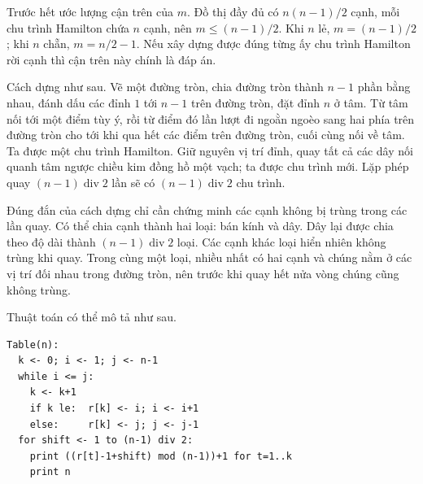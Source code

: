 \documentclass[11pt]{article}
\begin{document}
Trước hết ước lượng cận trên của $m$. Đồ thị đầy đủ có $n(n-1)/2$ cạnh, mỗi
chu trình Hamilton chứa $n$ cạnh, nên $m\le (n-1)/2$. Khi $n$ lẻ,
$m=(n-1)/2$; khi $n$ chẵn, $m=n/2-1$. Nếu xây dựng được đúng từng ấy chu
trình Hamilton rời cạnh thì cận trên này chính là đáp án.

Cách dựng như sau. Vẽ một đường tròn, chia đường tròn thành $n-1$ phần bằng
nhau, đánh dấu các đỉnh $1$ tới $n-1$ trên đường tròn, đặt đỉnh $n$ ở tâm.
Từ tâm nối tới một điểm tùy ý, rồi từ điểm đó lần lượt đi ngoằn ngoèo sang
hai phía trên đường tròn cho tới khi qua hết các điểm trên đường tròn, cuối
cùng nối về tâm. Ta được một chu trình Hamilton. Giữ nguyên vị trí đỉnh, quay
tất cả các dây nối quanh tâm ngược chiều kim đồng hồ một vạch; ta được chu
trình mới. Lặp phép quay $(n-1)\operatorname{div}2$ lần sẽ có
$(n-1)\operatorname{div}2$ chu trình.

\begin{center}
\end{center}

Đúng đắn của cách dựng chỉ cần chứng minh các cạnh không bị trùng trong các
lần quay. Có thể chia cạnh thành hai loại: bán kính và dây. Dây lại được chia
theo độ dài thành $(n-1)\operatorname{div}2$ loại. Các cạnh khác loại hiển
nhiên không trùng khi quay. Trong cùng một loại, nhiều nhất có hai cạnh và
chúng nằm ở các vị trí đối nhau trong đường tròn, nên trước khi quay hết nửa
vòng chúng cũng không trùng.

Thuật toán có thể mô tả như sau.

\begin{verbatim}
Table(n):
  k <- 0; i <- 1; j <- n-1
  while i <= j:
    k <- k+1
    if k le:  r[k] <- i; i <- i+1
    else:     r[k] <- j; j <- j-1
  for shift <- 1 to (n-1) div 2:
    print ((r[t]-1+shift) mod (n-1))+1 for t=1..k
    print n
\end{verbatim}
\end{document}
